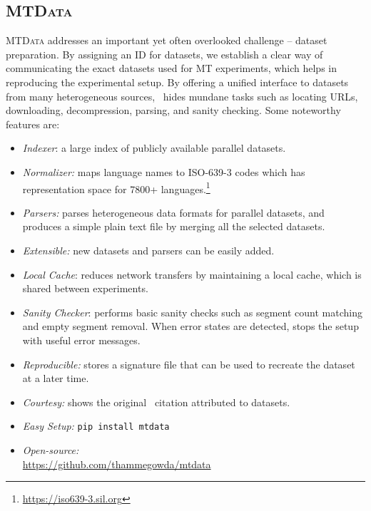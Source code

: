 \subsection{\textsc{MTData}}
\label{sec:mtdata}
\textsc{MTData} addresses an important yet often overlooked challenge -- dataset preparation. 
By assigning an ID for datasets, we establish a clear way of communicating the exact datasets used for MT experiments, which helps in reproducing the experimental setup.
By offering a unified interface to datasets from many heterogeneous sources, \mtdata\ hides mundane tasks such as locating URLs, downloading, decompression, parsing, and sanity checking. Some noteworthy features are:
\begin{itemize}[noitemsep,topsep=0pt,leftmargin=4mm]
\item \textit{Indexer}: a large index of publicly available parallel datasets.
\item \textit{Normalizer:} maps language names to ISO-639-3 codes which has representation space for 7800+ languages.\footnote{\url{https://iso639-3.sil.org}}
\item \textit{Parsers:} parses heterogeneous data formats for parallel datasets, and produces a simple plain text file by merging all the selected datasets.
\item \textit{Extensible:} new datasets and parsers can be easily added.
\item \textit{Local Cache}: reduces network transfers by maintaining a local cache, which is shared between experiments.
\item \textit{Sanity Checker}: performs basic sanity checks such as segment count matching and empty segment removal. When error states are detected, stops the setup with useful error messages.
\item \textit{Reproducible:} stores a signature file that can be used to recreate the dataset at a later time.
\item \textit{Courtesy:} shows the original \BibTeX\ citation attributed to datasets.
\item \textit{Easy Setup:} \texttt{pip install mtdata}
\item \textit{Open-source:} \\ \url{https://github.com/thammegowda/mtdata}
\end{itemize}

